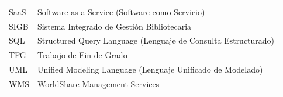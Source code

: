 \begin{table}[H]
\begin{tabularx}{\textwidth}{l X}
		\addlinespace
		SaaS & Software as a Service (Software como Servicio) \\
		\addlinespace
		SIGB & Sistema Integrado de Gestión Bibliotecaria \\
		\addlinespace
		SQL & Structured Query Language (Lenguaje de Consulta Estructurado) \\
		\addlinespace
		TFG & Trabajo de Fin de Grado \\
		\addlinespace
		UML & Unified Modeling Language (Lenguaje Unificado de Modelado) \\
		\addlinespace
		WMS & WorldShare Management Services \\
		\bottomrule
	\end{tabularx}
\end{table}